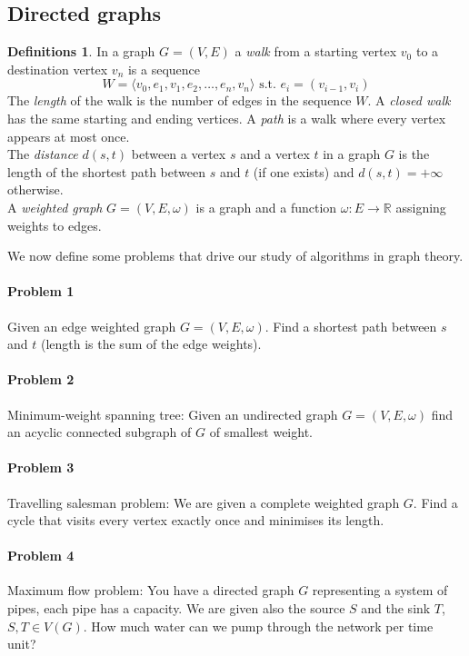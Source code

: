 \documentclass{article}
\theoremstyle{definition}
\newtheorem*{defns}{Definitions}
\newcommand{\RR}{\mathbb{R}}
\begin{document}
\subsection{Directed graphs}

\begin{defns}
In a graph $G= (V,E)$ a \emph{walk} from a starting vertex $v_0$ to a destination vertex $v_n$ is a sequence
$$W=\langle v_0,e_1,v_1,e_2,\ldots,e_n,v_n\rangle\text{ s.t. }e_i=(v_{i-1},v_i)$$
The \emph{length} of the walk is the number of edges in the sequence $W$.
A \emph{closed walk} has the same starting and ending vertices.
A \emph{path} is a walk where every vertex appears at most once.\\
The \emph{distance} $d(s,t)$ between a vertex $s$ and a vertex $t$ in a graph $G$ is the length of the shortest path between $s$ and $t$ (if one exists) and $d(s,t)=+\infty$ otherwise.\\
A \emph{weighted graph} $G= (V,E,\omega)$ is a graph and a function $\omega\colon E\to \RR$ assigning weights to edges.
\end{defns}

We now define some problems that drive our study of algorithms in graph theory.
\paragraph{Problem 1}
Given an edge weighted graph $G=(V,E,\omega)$.
Find a shortest path between $s$ and $t$ (length is the sum of the edge weights).

\paragraph{Problem 2}
Minimum-weight spanning tree:
Given an undirected graph $G=(V,E,\omega)$ find an acyclic connected subgraph of $G$ of smallest weight.

\paragraph{Problem 3}
Travelling salesman problem:
We are given a complete weighted graph $G$.
Find a cycle that visits every vertex exactly once and minimises its length.

\paragraph{Problem 4}
Maximum flow problem:
You have a directed graph $G$ representing a system of pipes, each pipe has a capacity.
We are given also the source $S$ and the sink $T$, $S,T\in V(G)$.
How much water can we pump through the network per time unit?
\end{document}
